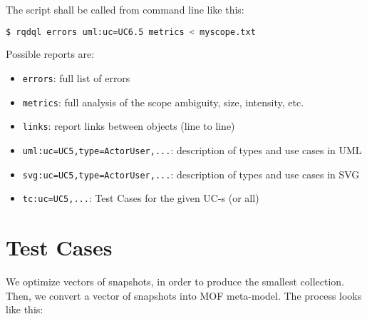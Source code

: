\documentclass{article}
\begin{document}
    The script shall be called from command line like this:

    \begin{lstlisting}[language=bash]
$ rqdql errors uml:uc=UC6.5 metrics < myscope.txt
    \end{lstlisting}

    Possible reports are:

    \begin{itemize}
        \item \texttt{errors}: full list of errors
        \item \texttt{metrics}: full analysis of the scope ambiguity, size, intensity, etc.
        \item \texttt{links}: report links between objects (line to line)
        \item \texttt{uml:uc=UC5,type=ActorUser,...}: description of types and use cases in UML
        \item \texttt{svg:uc=UC5,type=ActorUser,...}: description of types and use cases in SVG
        \item \texttt{tc:uc=UC5,...}: Test Cases for the given UC-s (or all)
    \end{itemize}

\section{Test Cases}\label{sec:test-cases}

    We optimize vectors of snapshots, in order
    to produce the smallest collection.
    Then, we convert a vector of snapshots into MOF meta-model.
    The process looks like this:

\end{document}
